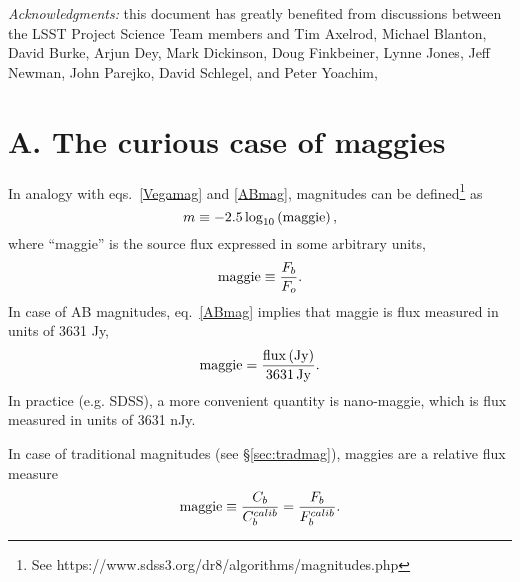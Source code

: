 \documentclass{emulateapj}
\begin{document}
\vskip 0.0in
\newpage
{\it Acknowledgments:} this document has greatly benefited from discussions between
the LSST Project Science Team members and Tim Axelrod, Michael Blanton, David 
Burke, Arjun Dey, Mark Dickinson, Doug Finkbeiner, Lynne Jones,  Jeff Newman, 
John Parejko, David Schlegel, and Peter Yoachim,




\appendix

\section{A. The curious case of maggies} 

In analogy with eqs.~\ref{Vegamag} and \ref{ABmag}, magnitudes can be defined\footnote{
See https://www.sdss3.org/dr8/algorithms/magnitudes.php} as 
\begin{equation}
\label{maggie}
               m \equiv - 2.5\log_{10}\left({\rm maggie}\right),
\end{equation}
where ``maggie'' is the source flux expressed in some arbitrary
units,
\begin{equation}
\label{maggie2}
               {\rm maggie} \equiv {F_b \over F_o}. 
\end{equation}
In case of AB magnitudes, eq.~\ref{ABmag} implies that maggie is 
flux measured in units of 3631 Jy, 
\begin{equation}
\label{eq:defmaggie} 
           {\rm maggie} = {{\rm flux \, (Jy)} \over {\rm 3631 \, Jy}}. 
\end{equation} 
In practice (e.g. SDSS), a more convenient
quantity is nano-maggie, which is flux measured in units of 3631 nJy.

In case of traditional magnitudes (see \S\ref{sec:tradmag}), maggies are a 
relative flux measure
\begin{equation}
\label{maggie3}
    {\rm maggie} \equiv {C_b  \over C_b^{calib}} = {F_b  \over F_b^{calib}}. 
\end{equation}
\end{document}
